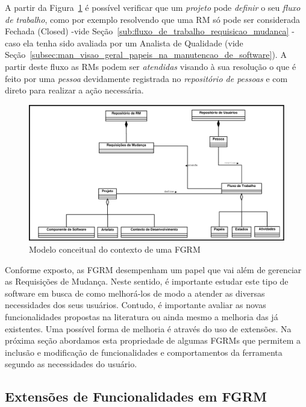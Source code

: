 A partir da Figura~\ref{fig:diagrama-classe-conceitual-fgrm} é possível
verificar que um \textit{projeto} pode \textit{definir} o seu \textit{fluxo de
    trabalho}, como por exemplo resolvendo que uma RM só pode ser considerada
Fechada (Closed) \@-\@ vide Seção~\ref{sub:fluxo_de_trabalho_requisicao_mudanca}
\@-\@ caso ela tenha sido avaliada por um Analista de Qualidade (vide
Seção~\ref{subsec:man_visao_geral_papeis_na_manutencao_de_software}). A partir
deste fluxo as RMs podem ser \textit{atendidas} visando à sua resolução o que é
feito por uma \textit{pessoa} devidamente registrada no \textit{repositório de
    pessoas} e com direto para realizar a ação necessária.

\begin{figure}[htpb] \centering
	\includegraphics[width=1.15\linewidth]{./chapter-manutencao-software-visao-geral/img/diagrama-classe-conceitual-fgrm.pdf}
	\caption{Modelo conceitual do contexto de uma FGRM}
\label{fig:diagrama-classe-conceitual-fgrm}
\end{figure}

Conforme exposto, as FGRM desempenham um papel que vai além de gerenciar as
Requisições de Mudança. Neste sentido, é importante estudar este tipo de
software em busca de como melhorá-los de modo a atender as diversas necessidades
dos seus usuários. Contudo, é importante avaliar as novas funcionalidades
propostas na li\-te\-ra\-tu\-ra ou ainda mesmo a melhoria das já existentes. Uma
possível forma de melhoria é através do uso de extensões. Na próxima seção
abordamos esta propriedade de algumas FGRMs que permitem a inclusão e
modificação de funcionalidades e comportamentos da ferramenta segundo as
necessidades do usuário.

\subsection{Extensões de Funcionalidades em FGRM}
\label{subsec:manutencao_visao_geral_extensoes_fgrm}

